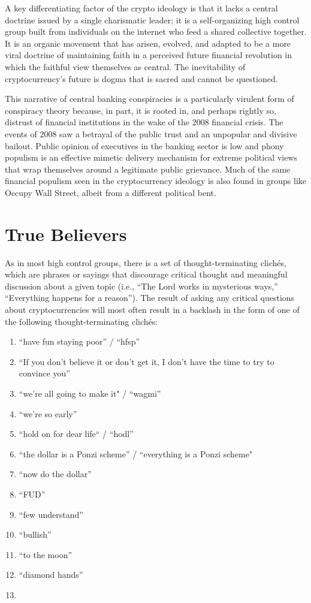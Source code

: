 A key differentiating factor of the crypto ideology is that it lacks a central
doctrine issued by a single charismatic leader; it is a self-organizing high
control group built from individuals on the internet who feed a shared
collective together. It is an organic movement that has arisen, evolved, and
adapted to be a more viral doctrine of maintaining faith in a perceived future
financial revolution in which the faithful view themselves as central. The
inevitability of cryptocurrency's future is dogma that is sacred and cannot be
questioned.


This narrative of central banking conspiracies is a particularly virulent form
of conspiracy theory because, in part, it is rooted in, and perhaps rightly so,
distrust of financial institutions in the wake of the 2008 financial crisis. The
events of 2008 saw a betrayal of the public trust and an unpopular and divisive
bailout. Public opinion of executives in the banking sector is low and phony
populism is an effective mimetic delivery mechanism for extreme political views
that wrap themselves around a legitimate public grievance.
\cite{varoufakis_yanis_2022} Much of the same financial populism seen in the
cryptocurrency ideology is also found in groups like Occupy Wall Street, albeit
from a different political bent.

\section{True Believers}

As in most high control groups, there is a set of thought-terminating clichés,
which are phrases or sayings that discourage critical thought and meaningful
discussion about a given topic \cite{montell_cultish_2021} (i.e., ``The Lord
works in mysterious ways,'' ``Everything happens for a reason''). The result of
asking any critical questions about cryptocurrencies will most often result in a
backlash in the form of one of the following thought-terminating clichés:

\begin{enumerate}
  \item ``have fun staying poor'' / ``hfsp''
  \item ``If you don't believe it or don't get it, I don't have the time to try to convince you''
  \item ``we're all going to make it" / ``wagmi''
  \item ``we're so early''
  \item ``hold on for dear life`` / ``hodl''
  \item ``the dollar is a Ponzi scheme'' / ``everything is a Ponzi scheme"
  \item ``now do the dollar''
  \item ``FUD''
  \item ``few understand''
  \item ``bullish''
  \item ``to the moon''
  \item ``diamond hands''
  \item {}
\end{enumerate}

